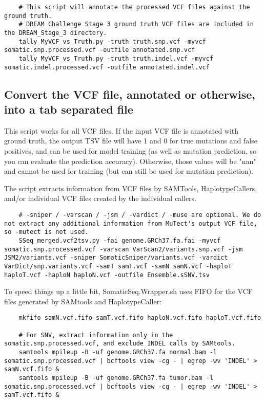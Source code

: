 \documentclass[10pt,letterpaper]{article}
\begin{document}
\begin{sloppypar}
\begin{lstlisting}
	# This script will annotate the processed VCF files against the ground truth.
	# DREAM Challenge Stage 3 ground truth VCF files are included in the DREAM_Stage_3 directory.
	tally_MyVCF_vs_Truth.py -truth truth.snp.vcf -myvcf somatic.snp.processed.vcf -outfile annotated.snp.vcf
	tally_MyVCF_vs_Truth.py -truth truth.indel.vcf -myvcf somatic.indel.processed.vcf -outfile annotated.indel.vcf
	\end{lstlisting}



	\subsection{Convert the VCF file, annotated or otherwise, into a tab separated file}
	This script works for all VCF files. If the input VCF file is annotated with ground truth, the output TSV file will have 1 and 0 for true mutations and false positives, and can be used for model training (as well as mutation prediction, so you can evaluate the prediction accuracy). Otherwise, those values will be "nan" and cannot be used for training (but can still be used for mutation prediction). 
	
	The script extracts information from VCF files by SAMTools, HaplotypeCallers, and/or individual VCF files created by the individual callers. 
	
	
	\begin{lstlisting}
	# -sniper / -varscan / -jsm / -vardict / -muse are optional. We do not extract any additional information from MuTect's output VCF file, so -mutect is not used. 
	SSeq_merged.vcf2tsv.py -fai genome.GRCh37.fa.fai -myvcf somatic.snp.processed.vcf -varscan VarScan2/variants.snp.vcf -jsm JSM2/variants.vcf -sniper SomaticSniper/variants.vcf -vardict VarDict/snp.variants.vcf -samT samT.vcf -samN samN.vcf -haploT haploT.vcf -haploN haploN.vcf -outfile Ensemble.sSNV.tsv
	\end{lstlisting}
	
	To speed things up a little bit, SomaticSeq.Wrapper.sh uses FIFO for the VCF files generated by SAMtools and HaplotypeCaller:
	
	\begin{lstlisting}
	mkfifo samN.vcf.fifo samT.vcf.fifo haploN.vcf.fifo haploT.vcf.fifo

	# For SNV, extract information only in the somatic.snp.processed.vcf, and exclude INDEL calls by SAMtools.
	samtools mpileup -B -uf genome.GRCh37.fa normal.bam -l somatic.snp.processed.vcf | bcftools view -cg - | egrep -wv 'INDEL' > samN.vcf.fifo &
	samtools mpileup -B -uf genome.GRCh37.fa tumor.bam -l somatic.snp.processed.vcf | bcftools view -cg - | egrep -wv 'INDEL' > samT.vcf.fifo &


\end{lstlisting}
\end{sloppypar}
\end{document}
